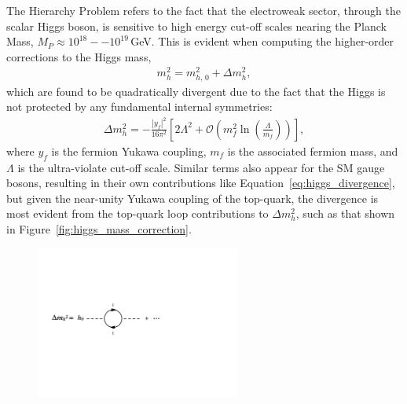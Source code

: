 \begin{description}
        The Hierarchy Problem refers to the fact that the electroweak sector, through the scalar Higgs boson,
        is sensitive to high energy cut-off scales nearing the Planck Mass, $M_{P} \approx 10^{18}--10^{19}$\,GeV.
        This is evident when computing the higher-order corrections to the Higgs mass,
        \begin{align*}
            m_h^2 = m_{h,\,0}^2 + \Delta m_h^2,
        \end{align*}
        which are found to be quadratically divergent due to the fact that the Higgs is not protected by any fundamental
        internal symmetries:
        \begin{align}
            \Delta m_h^2 = -\frac{ |y_f|^2 }{16 \pi^2} \left[ 2 \Lambda^2  + \mathcal{O} \left( m_f^2 \ln \left( \frac{\Lambda}{m_f} \right) \right) \right],
            \label{eq:higgs_divergence}
        \end{align}
        where $y_f$ is the fermion Yukawa coupling, $m_f$ is the associated fermion mass, and $\Lambda$ is the
        ultra-violate cut-off scale.
        Similar terms also appear for the SM gauge bosons, resulting in their own contributions like Equation~\ref{eq:higgs_divergence}, but given the near-unity Yukawa coupling of the top-quark,
        the divergence is most evident from the top-quark loop contributions to $\Delta m_h^2$, such as that shown in Figure~\ref{fig:higgs_mass_correction}.
        \begin{figure}[!htb]
        \hspace{1.8cm}
        \begin{minipage}{0.8\textwidth}
            \begin{center}
                \includegraphics[width=0.6\textwidth]{figures/higgs_corr/higgs_mass_correctionsPDF}
                \caption{
}
\end{center}
\end{minipage}
\end{figure}
\end{description}
